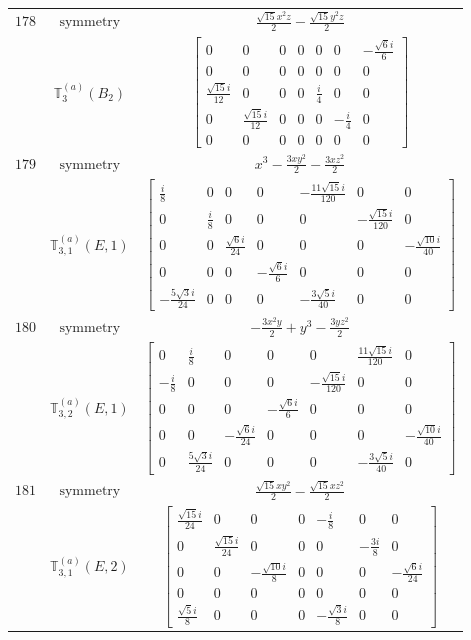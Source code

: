 \documentclass[fleqn,8pt,landscape]{jsarticle}
\begin{document}
\begin{longtable}{ccc}
$ 178 $ & $ \text{symmetry} $ & $ \frac{\sqrt{15} x^{2} z}{2} - \frac{\sqrt{15} y^{2} z}{2} $ \\
$  $ & $ \mathbb{T}_{3}^{(a)}(B_{2}) $ & $ \begin{bmatrix} 0 & 0 & 0 & 0 & 0 & 0 & - \frac{\sqrt{6} i}{6} \\ 0 & 0 & 0 & 0 & 0 & 0 & 0 \\ \frac{\sqrt{15} i}{12} & 0 & 0 & 0 & \frac{i}{4} & 0 & 0 \\ 0 & \frac{\sqrt{15} i}{12} & 0 & 0 & 0 & - \frac{i}{4} & 0 \\ 0 & 0 & 0 & 0 & 0 & 0 & 0 \end{bmatrix} $ \\ \hline
$ 179 $ & $ \text{symmetry} $ & $ x^{3} - \frac{3 x y^{2}}{2} - \frac{3 x z^{2}}{2} $ \\
$  $ & $ \mathbb{T}_{3,1}^{(a)}(E,1) $ & $ \begin{bmatrix} \frac{i}{8} & 0 & 0 & 0 & - \frac{11 \sqrt{15} i}{120} & 0 & 0 \\ 0 & \frac{i}{8} & 0 & 0 & 0 & - \frac{\sqrt{15} i}{120} & 0 \\ 0 & 0 & \frac{\sqrt{6} i}{24} & 0 & 0 & 0 & - \frac{\sqrt{10} i}{40} \\ 0 & 0 & 0 & - \frac{\sqrt{6} i}{6} & 0 & 0 & 0 \\ - \frac{5 \sqrt{3} i}{24} & 0 & 0 & 0 & - \frac{3 \sqrt{5} i}{40} & 0 & 0 \end{bmatrix} $ \\ \hline
$ 180 $ & $ \text{symmetry} $ & $ - \frac{3 x^{2} y}{2} + y^{3} - \frac{3 y z^{2}}{2} $ \\
$  $ & $ \mathbb{T}_{3,2}^{(a)}(E,1) $ & $ \begin{bmatrix} 0 & \frac{i}{8} & 0 & 0 & 0 & \frac{11 \sqrt{15} i}{120} & 0 \\ - \frac{i}{8} & 0 & 0 & 0 & - \frac{\sqrt{15} i}{120} & 0 & 0 \\ 0 & 0 & 0 & - \frac{\sqrt{6} i}{6} & 0 & 0 & 0 \\ 0 & 0 & - \frac{\sqrt{6} i}{24} & 0 & 0 & 0 & - \frac{\sqrt{10} i}{40} \\ 0 & \frac{5 \sqrt{3} i}{24} & 0 & 0 & 0 & - \frac{3 \sqrt{5} i}{40} & 0 \end{bmatrix} $ \\ \hline
$ 181 $ & $ \text{symmetry} $ & $ \frac{\sqrt{15} x y^{2}}{2} - \frac{\sqrt{15} x z^{2}}{2} $ \\
$  $ & $ \mathbb{T}_{3,1}^{(a)}(E,2) $ & $ \begin{bmatrix} \frac{\sqrt{15} i}{24} & 0 & 0 & 0 & - \frac{i}{8} & 0 & 0 \\ 0 & \frac{\sqrt{15} i}{24} & 0 & 0 & 0 & - \frac{3 i}{8} & 0 \\ 0 & 0 & - \frac{\sqrt{10} i}{8} & 0 & 0 & 0 & - \frac{\sqrt{6} i}{24} \\ 0 & 0 & 0 & 0 & 0 & 0 & 0 \\ \frac{\sqrt{5} i}{8} & 0 & 0 & 0 & - \frac{\sqrt{3} i}{8} & 0 & 0 \end{bmatrix} $ \\ \hline

\end{longtable}
\end{document}
